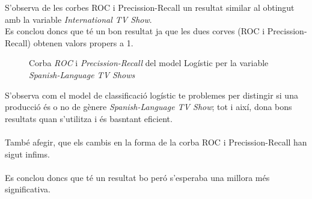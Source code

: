 \documentclass[a4paper, 11pt]{article}
\begin{document}
\hspace{-1.5em}S'observa de les corbes ROC i Precission-Recall un resultat similar al obtingut amb la variable \textit{International TV Show}.\\
Es conclou doncs que té un bon resultat ja que les dues corves (ROC i Precission-Recall) obtenen valors propers a 1.\\
\begin{figure}[h]
\centering
    \caption{Corba \textit{ROC} i \textit{Precission-Recall} del model Logístic per la variable \textit{Spanish-Language TV Shows}}
    \label{fig:my_label}
\end{figure}
S'observa com el model de classificació logístic te problemes per distingir si una producció és o no de gènere \textit{Spanish-Language TV Show}; tot i així, dona bons resultats quan s'utilitza i és basntant eficient.\\\\
També afegir, que els cambis en la forma de la corba ROC i Precission-Recall han sigut infims.\\\\
Es conclou doncs que té un resultat bo peró s'esperaba una millora més significativa.\\
\newpage 
\end{document}
